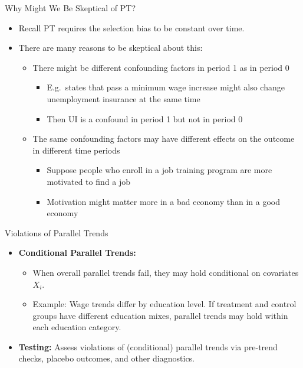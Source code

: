 \documentclass[11pt,aspectratio=169]{beamer}
\begin{document}
\begin{frame}{Why Might We Be Skeptical of PT?}
\begin{itemize}
  \item Recall PT requires the selection bias to be constant over time.
  \item There are many reasons to be skeptical about this:
  \begin{itemize}
    \item There might be different confounding factors in period 1 as in period 0
    \begin{itemize}
      \item E.g.\ states that pass a minimum wage increase might also change unemployment insurance at the same time
      \item Then UI is a confound in period 1 but not in period 0
    \end{itemize}
    \item The same confounding factors may have different effects on the outcome in different time periods
    \begin{itemize}
      \item Suppose people who enroll in a job training program are more motivated to find a job
      \item Motivation might matter more in a bad economy than in a good economy
    \end{itemize}
  \end{itemize}
\end{itemize}
\end{frame}

\begin{frame}{Violations of Parallel Trends}
\begin{itemize}
  \item \textbf{Conditional Parallel Trends:}
  \begin{itemize}
    \item When overall parallel trends fail, they may hold conditional on covariates $X_i$.
    \item Example: Wage trends differ by education level. If treatment and control groups have different education mixes, parallel trends may hold within each education category.
  \end{itemize}
  \item \textbf{Testing:} Assess violations of (conditional) parallel trends via pre-trend checks, placebo outcomes, and other diagnostics.
\end{itemize}
\end{frame}
\end{document}
